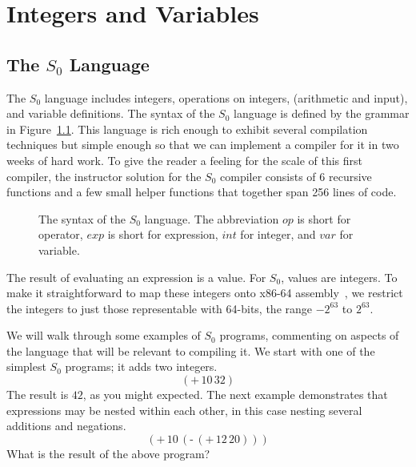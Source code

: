 \documentclass[12pt]{book}
\makeatletter
\newenvironment{chapquote}[2][2em]
  {\setlength{\@tempdima}{#1}%
   \def\chapquote@author{#2}%
   \parshape 1 \@tempdima \dimexpr\textwidth-2\@tempdima\relax%
   \itshape}
  {\par\normalfont\hfill--\ \chapquote@author\hspace*{\@tempdima}\par\bigskip}
\newcommand{\itm}[1]{\ensuremath{\mathit{#1}}}
\newcommand{\Exp}{\itm{exp}}
\newcommand{\Int}{\itm{int}}
\newcommand{\Var}{\itm{var}}
\newcommand{\Op}{\itm{op}}
\newcommand{\key}[1]{\texttt{#1}}
\newcommand{\UNIOP}[2]{(\key{#1}\,#2)}
\newcommand{\BINOP}[3]{(\key{#1}\,#2\,#3)}
\newcommand{\LET}[3]{(\key{let}\,([#1\;#2])\,#3)}
\makeatother
\begin{document}
\chapter{Integers and Variables}
\label{ch:int-exp}


\section{The $S_0$ Language}

The $S_0$ language includes integers, operations on integers,
(arithmetic and input), and variable definitions.  The syntax of the
$S_0$ language is defined by the grammar in
Figure~\ref{fig:s0-syntax}. This language is rich enough to exhibit
several compilation techniques but simple enough so that we can
implement a compiler for it in two weeks of hard work.  To give the
reader a feeling for the scale of this first compiler, the instructor
solution for the $S_0$ compiler consists of 6 recursive functions and
a few small helper functions that together span 256 lines of code.

\begin{figure}[htbp]
\centering
\fbox{
\begin{minipage}{0.85\textwidth}
\[
\begin{array}{lcl}
  \Op  &::=& \key{+} \mid \key{-} \mid \key{*} \mid \key{read} \\
  \Exp &::=& \Int \mid (\Op \; \Exp^{*}) \mid \Var \mid \LET{\Var}{\Exp}{\Exp}
\end{array}
\]
\end{minipage}
}
\caption{The syntax of the $S_0$ language. The abbreviation \Op{} is
  short for operator, \Exp{} is short for expression, \Int{} for integer,
  and \Var{} for variable.}
\label{fig:s0-syntax}
\end{figure}

The result of evaluating an expression is a value.  For $S_0$, values
are integers. To make it straightforward to map these integers onto
x86-64 assembly~\citep{Matz:2013aa}, we restrict the integers to just
those representable with 64-bits, the range $-2^{63}$ to $2^{63}$.

We will walk through some examples of $S_0$ programs, commenting on
aspects of the language that will be relevant to compiling it.  We
start with one of the simplest $S_0$ programs; it adds two integers.
\[
\BINOP{+}{10}{32}
\]
The result is $42$, as you might expected. 
%
The next example demonstrates that expressions may be nested within
each other, in this case nesting several additions and negations.
\[
\BINOP{+}{10}{ \UNIOP{-}{ \BINOP{+}{12}{20} } }
\]
What is the result of the above program?
\end{document}
